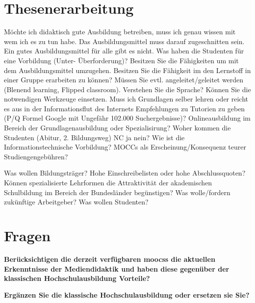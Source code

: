 \documentclass[150]{HSMW-Thesis}
\begin{document}


\begin{Referat}
\end{Referat}

\begin{Vorwort}
\end{Vorwort}


\Hauptteil



\chapter{Thesenerarbeitung}
Möchte ich didaktisch gute Ausbildung betreiben, muss ich genau wissen mit wem ich es zu tun habe. Das Ausbildungsmittel muss darauf zugeschnitten sein. 
Ein gutes Ausbildungsmittel für alle gibt es nicht. Was haben die Studenten für eine Vorbildung (Unter- Überforderung)? 
Besitzen Sie die Fähigkeiten um mit dem Ausbildungsmittel umzugehen. Besitzen Sie die Fähigkeit im den Lernstoff in einer Gruppe erarbeiten zu können?
Müssen Sie evtl. angeleitet/geleitet werden (Blenend learning, Flipped classroom). Verstehen Sie die Sprache? Können Sie die notwendigen Werkzeuge einsetzen.
Muss ich Grundlagen selber lehren oder reicht es aus in der Informationsflut des Internets Empfehlungen zu Tutorien zu geben (P/Q Formel Google mit Ungefähr 102.000 Suchergebnisse)?
Onlineausbildung im Bereich der Grundlagenausbildung oder Spezialisirung? Woher kommen die Studenten (Abitur, 2. Bildungsweg) NC ja nein? Wie ist die Informationstechnische Vorbildung? 
MOCCs als Erscheinung/Konsequenz teurer Studiengengebühren? 

Was wollen Bildungsträger? Hohe Einschreibelisten oder hohe Abschlussquoten? Können spezialisierte Lehrformen die Attraktivität der akademischen Schulbildung im Bereich der Bundesländer begünstigen? 
Was wolle/fordern zukünftige Arbeitgeber? Was wollen Studenten?



\chapter{Fragen}
\textbf{Berücksichtigen die derzeit verfügbaren \glspl{moocs} die aktuellen Erkenntnisse der Mediendidaktik und haben diese gegenüber der klassischen Hochschulausbildung Vorteile?}

\textbf{Ergänzen Sie die klassische Hochschulausbildung oder ersetzen sie Sie?}
\end{document}
